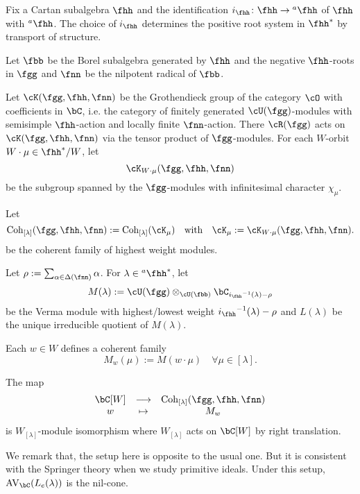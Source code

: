 \documentclass[counting_main.tex]{subfiles}
\begin{document}
\begin{eg}\label{eg:hw}
  Fix a Cartan subalgebra $\fhh$ and the identification
  $\ihh\colon \fhh\rightarrow \ahh $ of $\fhh$ with $\ahh$. The choice of $\ihh$
  determines the positive root system in $\fhh^{*}$ by transport of structure.

  Let $\fbb$ be the Borel subalgebra generated by $\fhh$ and the negative
  $\fhh$-roots in $\fgg$ and $\fnn$ be the nilpotent radical of $\fbb$.

  Let $\Grt(\fgg,\fhh,\fnn)$ be the Grothendieck group of the category $\cO$
  with coefficients in $\bC$, i.e. the category of finitely generated
  $\cU(\fgg)$-modules with semisimple $\fhh$-action and locally finite
  $\fnn$-action. There $\Rg$ acts on $\Grt(\fgg,\fhh,\fnn)$ via the tensor
  product of $\fgg$-modules. For each $W$-orbit $W\cdot \mu\in \fhh^{*}/W$, let
  \[
    \Grt_{W\cdot \mu}(\fgg,\fhh,\fnn)
  \]
  be the subgroup spanned by the $\fgg$-modules with infinitesimal character
  $\chi_{\mu}$.

  Let
  \[
    \Coh_{[\lambda]}(\fgg,\fhh,\fnn) := \Coh_{[\lambda]}(\cK_{\mu}) \quad \text{with} \quad \cK_{\mu} := \Grt_{W\cdot \mu}(\fgg,\fhh,\fnn).
  \]
  be the coherent family of highest weight modules.


  Let $\rho := \sum_{\alpha\in \WT{\fnn}} \alpha$. For $\lambda\in \ahh^{*}$,
  let
  \[
    M(\lambda) := \cU(\fgg)\otimes_{\cU(\fbb)} \bC_{\ihh^{-1}(\lambda)-\rho}
  \]
  be the Verma module with highest/lowest weight $\ihh^{-1}(\lambda)-\rho$ and
  $L(\lambda) $ be the unique irreducible quotient of $M(\lambda)$.

  Each $w\in W$ defines a coherent family %
  \[
    M_w(\mu) := M(w\cdot \mu) \quad \forall \mu \in [\lambda].
  \]

  The map
  \[
    \begin{array}{ccc}
      \bC[W] & \longrightarrow & \Coh_{[\lambda]}(\fgg,\fhh,\fnn)  \\
      w& \mapsto &M_{w}
    \end{array}
  \]
  is $W_{[\lambda]}$-module isomorphism where $W_{[\lambda]}$ acts on $\bC[W]$
  by right translation.


  We remark that, the setup here is opposite to the usual one. But it is
  consistent with the Springer theory when we study primitive ideals. Under this
  setup, $\AVC(L_{e}(\lambda))$ is the nil-cone.


\end{eg}
\end{document}
